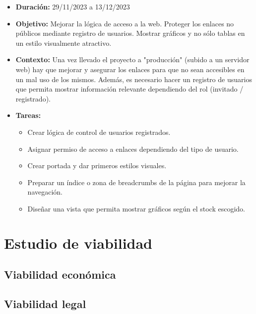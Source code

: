 \begin{itemize}
\item  
\textbf{Duración:} 29/11/2023 a 13/12/2023

\item
\textbf{Objetivo:} Mejorar la lógica de acceso a la web. Proteger los enlaces no públicos mediante registro de usuarios. Mostrar gráficos y no sólo tablas en un estilo visualmente atractivo. 

\item
\textbf{Contexto:} Una vez llevado el proyecto a "producción" (subido a un servidor web) hay que mejorar y asegurar los enlaces para que no sean accesibles en un mal uso de los mismos. Además, es necesario hacer un registro de usuarios que permita mostrar información relevante dependiendo del rol (invitado / registrado). 

\item
\textbf{Tareas:}
	\begin{itemize}
	\tightlist
	\item 
	Crear lógica de control de usuarios registrados.
	\item 	
	Asignar permiso de acceso a enlaces dependiendo del tipo de usuario. 
	\item 
	Crear portada y dar primeros estilos visuales. 
  	\item 
  	Preparar un índice o zona de breadcrumbs de la página para mejorar la navegación.
  	\item 
  	Diseñar una vista que permita mostrar gráficos según el stock escogido. 
  	\end{itemize}
\end{itemize}


\section{Estudio de viabilidad}

\subsection{Viabilidad económica}

\subsection{Viabilidad legal}


